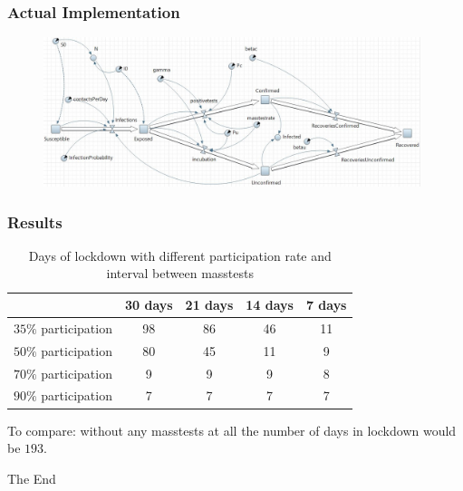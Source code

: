 \documentclass{beamer}
\begin{document}
\begin{frame}
\frametitle{Actual Implementation}

\begin{figure}[h!]
\includegraphics[width=110mm, scale = 0.5]{AnyLogicSIR}
\end{figure}
\end{frame}

\begin{frame}
\frametitle{Results}

\begin{table}[!h]
{\small%
\begin{center}
\begin{tabular}{|c||c|c|c|c|}
 \hline
 & 30 days    & 21 days   & 14 days  & 7 days  \\
  \hline
  \hline
      $35\%$ participation    & 98 &  86&  46  & 11   \\
  \hline
      $50\%$ participation & 80 & 45 & 11 & 9 \\
  \hline
      $70\%$ participation & 9 &  9 & 9& 8 \\
  \hline
      $90\%$ participation & 7 &7 &7  & 7\\
      \hline
\end{tabular}
\end{center}
}%

\caption{Days of lockdown with different participation rate and interval between masstests}
\end{table}
To compare: without any masstests at all the number of days in lockdown would be $193$.
\end{frame}

\begin{frame}
\Huge{\centerline{The End}}
\end{frame}

\end{document}
